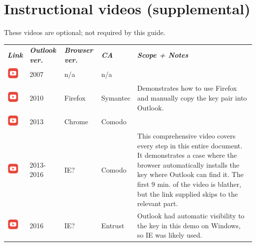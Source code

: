 \documentclass[pdftex,12pt,titlepage=false]{scrartcl}
\begin{document}
\section{Instructional videos (supplemental)}
These videos are optional; not required by this guide.\\[0.5em]

\begin{tabular}{>{\centering}m{8mm}lllp{}}
  \slshape\textbf{Link} & \slshape\textbf{Outlook ver.} & \slshape\textbf{Browser ver.} & \slshape\textbf{CA} & \slshape\textbf{Scope + Notes}\\
  \href{https://www.youtube.com/watch?v=6OxOo-w3Ymo}{\includegraphics[height=6mm]{images/icon_vid.png}}
  & 2007 & n/a & n/a &\\
  \href{https://www.youtube.com/watch?v=wGHaB0elkaA}{\includegraphics[height=6mm]{images/icon_vid.png}}
  & 2010 & Firefox & Symantec & Demonstrates how to use Firefox and manually copy the key pair into Outlook.\\
  \href{https://www.youtube.com/watch?v=n3rOEpGjrc}{\includegraphics[height=6mm]{images/icon_vid.png}}
  & 2013 & Chrome & Comodo & \\
  \href{https://www.youtube.com/watch?v=sfancZGEGjg\&start=535}{\includegraphics[height=6mm]{images/icon_vid.png}}
  & 2013-2016 & IE? & Comodo & This comprehensive video covers every step in this entire document.  It demonstrates a case where the browser automatically installs the key where Outlook can find it.  The first 9 min. of the video is blather, but the link supplied skips to the relevant part.\\
  \href{https://www.youtube.com/watch?v=4fmBzeq8BVA}{\includegraphics[height=6mm]{images/icon_vid.png}}
  & 2016 & IE? & Entrust & Outlook had automatic visibility to the key in this demo on Windows, so IE was likely used.\\
\end{tabular}
\end{document}
